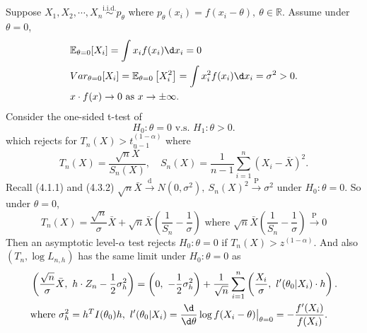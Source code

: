 \documentclass[a4paper]{article}
\begin{document}
\begin{eg}[T-test]
	Suppose $X_1,X_2,\cdots,X_n \stackrel{\text{i.i.d.}}{\sim} p_{\theta}$ where $p_{\theta}(x_i) = f(x_i - \theta), \ \theta \in \mathbb{R}$. Assume under $\theta = 0$,
	\begin{equation*}
		\begin{aligned}
			&\mathbb{E}_{\theta = 0} [X_i] = \int x_i f(x_i) \d x_i = 0 \\
			&Var_{\theta = 0} [X_i] = \mathbb{E}_{\theta = 0}\left[X_i^2\right] = \int x_i^2 f(x_i) \d x_i = \sigma^2 > 0. \\
			& x \cdot f(x) \to 0 \text{ as } x \to \pm \infty.
		\end{aligned}
	\end{equation*}
	Consider the one-sided t-test of
	\begin{equation*}
		H_0: \theta = 0 \text{ v.s. } H_1: \theta > 0.
	\end{equation*}
	which rejects for $T_n(X) > t_{n-1}^{(1-\alpha)}$ where
	\begin{equation*}
		T_n(X) = \frac{\sqrt{n} \bar{X}}{S_n(X)}, \quad S_n(X) = \frac{1}{n-1} \sum\limits_{i=1}^n (X_i - \bar{X})^2.
	\end{equation*}
	Recall (4.1.1) and (4.3.2) $\sqrt{n} \bar{X} \stackrel{\text{d}}{\longrightarrow} N(0,\sigma^2), \ S_n(X)^2 \stackrel{\text{P}}{\longrightarrow} \sigma^2$ under $H_0: \theta = 0$. So under $\theta = 0$, 
	\begin{equation*}
		T_n(X) = \frac{\sqrt{n}}{\sigma}\bar{X} + \sqrt{n} \bar{X} \left(\frac{1}{S_n} - \frac{1}{\sigma}\right) \text{ where } \sqrt{n} \bar{X} \left(\frac{1}{S_n} - \frac{1}{\sigma}\right) \stackrel{\text{P}}{\longrightarrow} 0
	\end{equation*}
	Then an asymptotic level-$\alpha$ test rejects $H_0: \theta = 0$ if $T_n(X) > z^{(1-\alpha)}$. And also $(T_n,\log L_{n,h})$ has the same limit under $H_0: \theta = 0$ as
	\begin{equation*}
		\begin{aligned}
			&\left(\frac{\sqrt{n}}{\sigma}\bar{X},\ h \cdot Z_n - \frac{1}{2} \sigma_h^2\right) = \left(0,\ -\frac{1}{2} \sigma_h^2\right) + \frac{1}{\sqrt{n}} \sum\limits_{i=1}^n \left(\frac{X_i}{\sigma}, \ l'(\theta_0|X_i) \cdot h\right). \\
			& \text{where } \sigma_h^2 = h^T I(\theta_0) h , \ l'(\theta_0|X_i) = \frac{\d}{\d \theta} \log f(X_i - \theta) \big|_{\theta = 0} = -\frac{f'(X_i)}{f(X_i)}.
		\end{aligned}
	\end{equation*}

\end{eg}
\end{document}
